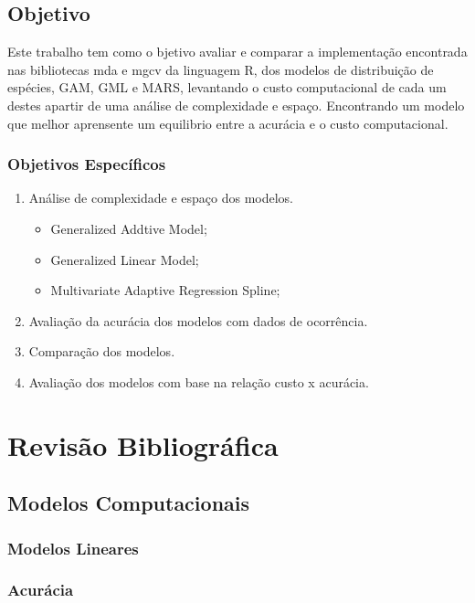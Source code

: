\documentclass[
	12pt,				%
	openright,			%
	oneside,			%
	a4paper,			%
	english,			%
	brazil				%
	]{abntex2}
\begin{document}
\section{Objetivo}

Este trabalho tem como o bjetivo avaliar e comparar a implementação encontrada nas bibliotecas mda e mgcv da linguagem R, dos modelos
de distribuição de espécies, GAM, GML e MARS, levantando o custo computacional de cada um destes apartir de uma análise de 
complexidade e espaço. Encontrando um modelo que melhor aprensente um equilibrio entre a acurácia e o custo computacional.

\subsection{Objetivos Específicos}

\begin{enumerate}
	\item Análise de complexidade e espaço dos modelos.
	\begin{itemize}
		\item Generalized Addtive Model;
		\item Generalized Linear Model;
		\item Multivariate Adaptive Regression Spline;
	\end{itemize}
	\item Avaliação da acurácia dos modelos com dados de ocorrência.
	\item Comparação dos modelos.
	\item Avaliação dos modelos com base na relação custo x acurácia.
\end{enumerate}


\chapter{Revisão Bibliográfica}

\section{Modelos Computacionais}
\subsection{Modelos Lineares}
\subsection{Acurácia}
\end{document}
